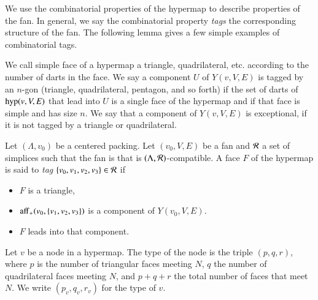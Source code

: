We use the combinatorial properties of the hypermap to describe
properties of the fan.  In general, we say the combinatorial
property {\it tags} the corresponding structure of the fan.
The following lemma gives a few simple examples of combinatorial
tags.


\begin{definition} 
We call simple face of a hypermap a triangle, quadrilateral, etc.
according to the number of darts in the face.  
We say a component $U$ of $Y(v,V,E)$ is
tagged by an
$n$-gon (triangle, quadrilateral, pentagon, and so forth) if
the set of darts of ${\operatorname{hyp}}(v,V,E)$ that lead into $U$ is
a single face of the hypermap and if that face is simple and has
size $n$.   We say that
a component of $Y(v,V,E)$ is exceptional, if it is not tagged by a
triangle or quadrilateral.
\end{definition}


\begin{definition}[tag]
Let $(\Lambda,v_0)$ be a centered packing.  Let $(v_0,V,E)$ be a fan
and ${\mathcal R}$ a set of simplices such that the fan is
that is $(\Lambda,{\mathcal R})$-compatible.  A face $F$ of the hypermap is said
to {\it tag} $\{v_0,v_1,v_2,v_3\}\in {\mathcal R}$ if 
\begin{itemize}
 \item $F$ is a triangle,
 \item  ${\operatorname{aff}}_+(v_0,\{v_1,v_2,v_3\})$ is a component of
  $Y(v_0,V,E)$.
 \item $F$ leads into that component.
\end{itemize}
\end{definition}







\begin{definition}[type]  Let $v$ be a node in a hypermap.
The type of the node is the triple $(p,q,r)$, 
where $p$ is the number of triangular
faces meeting $N$, $q$ the number of quadrilateral faces meeting
$N$, and $p+q+r$ the
total number of faces that meet $N$.
We write $(p_v,q_v,r_v)$ for the type of $v$.
\end{definition}

